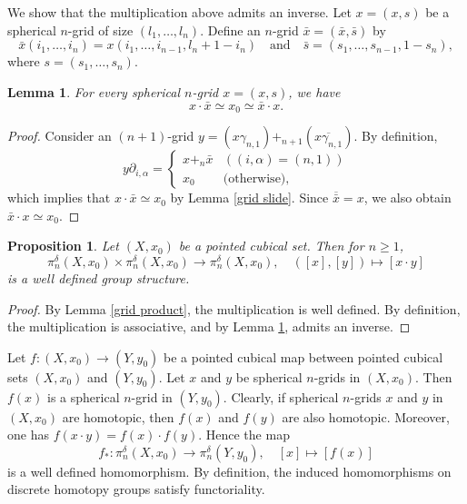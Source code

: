 \documentclass[oneside, 12pt]{amsart}
\numberwithin{equation}{section}
\theoremstyle{plain}
\newtheorem{proposition}[theorem]{Proposition}
\newtheorem{lemma}[theorem]{Lemma}
\theoremstyle{definition}
\theoremstyle{remark}
\begin{document}
	
	
	We show that the multiplication above admits an inverse. Let $x=(x,s)$ be a spherical $n$-grid of size $(l_1,\ldots,l_n)$. Define an $n$-grid $\bar{x}=(\bar{x},\bar{s})$ by
	\[
	\bar{x}(i_1,\ldots,i_n)=x(i_1,\ldots,i_{n-1},l_n+1-i_n)\quad\text{and}\quad\bar{s}=(s_1,\ldots,s_{n-1},1-s_n),
	\]
	where $s=(s_1,\ldots,s_n)$.
	
	
	
	\begin{lemma}
		\label{grid inverse}
		For every spherical $n$-grid $x=(x,s)$, we have
		\[
		x\cdot\bar{x}\simeq x_0\simeq \bar{x}\cdot x.
		\]
	\end{lemma}
	
	\begin{proof}
		Consider an $(n+1)$-grid $y=(x{\gamma_{n,1}})+_{n+1}(\overline{x{\gamma_{n,1}}})$. By definition,
		\[
		y\partial_{i,\alpha}=\begin{cases}
			x+_n\bar{x}&((i,\alpha)=(n,1))\\
			x_0&\text{(otherwise)},
		\end{cases}
		\]
		which implies that $x\cdot\bar{x}\simeq x_0$ by Lemma \ref{grid slide}. Since $\overline{\bar{x}}=x$, we also obtain $\bar{x}\cdot x\simeq x_0$.
	\end{proof}
	
	
	
	\begin{proposition}
		Let $(X,x_0)$ be a pointed cubical set. Then for $n\ge 1$,
		\[
		\pi_n^\delta(X,x_0)\times\pi_n^\delta(X,x_0)\to\pi_n^\delta(X,x_0),\quad([x],[y])\mapsto[x\cdot y]
		\]
		is a well defined group structure.
	\end{proposition}
	
	\begin{proof}
		By Lemma \ref{grid product}, the multiplication is well defined. By definition, the multiplication is associative, and by Lemma \ref{grid inverse}, admits an inverse.
	\end{proof}
	
	
	
	Let $f\colon(X,x_0)\to(Y,y_0)$ be a pointed cubical map between pointed cubical sets $(X,x_0)$ and $(Y,y_0)$. Let $x$ and $y$ be spherical $n$-grids in $(X,x_0)$. Then $f(x)$ is a spherical $n$-grid in $(Y,y_0)$. Clearly, if spherical $n$-grids $x$ and $y$ in $(X,x_0)$ are homotopic, then $f(x)$ and $f(y)$ are also homotopic. Moreover, one has $f(x\cdot y)=f(x)\cdot f(y)$. Hence the map
	\[
	f_*\colon\pi_n^\delta(X,x_0)\to\pi_n^\delta(Y,y_0),\quad[x]\mapsto[f(x)]
	\]
	is a well defined homomorphism. By definition, the induced homomorphisms on discrete homotopy groups satisfy functoriality. %
	
\end{document}
